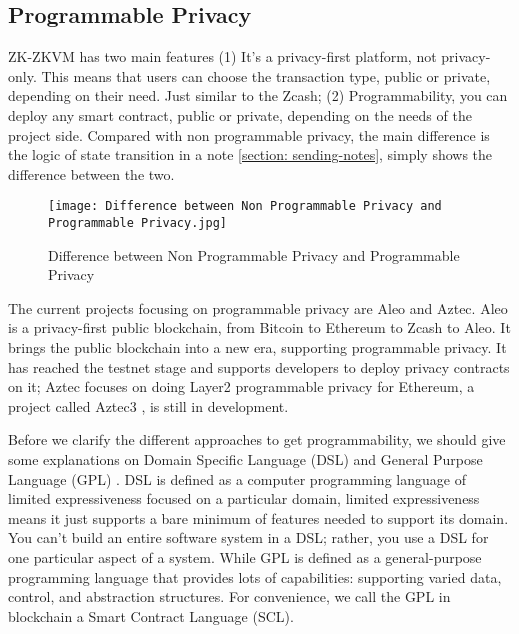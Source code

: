 \subsection{Programmable Privacy}

ZK-ZKVM has two main features (1) It's a privacy-first platform, not privacy-only. This means that users can choose the transaction type, public or private, depending on their need. Just similar to the Zcash;
(2) Programmability, you can deploy any smart contract, public or private, depending on the needs of the project side. Compared with non programmable privacy, the main difference is the logic of state transition in a note \ref{section: sending-notes},  simply shows the difference 
between the two.
\begin{figure}[!ht]
    \centering
    \texttt{[image: Difference between Non Programmable Privacy and Programmable Privacy.jpg]}
    \caption{Difference between Non Programmable Privacy and Programmable Privacy}
    \label{fig:Difference between Non Programmable Privacy and Programmable Privacy}
\end{figure}

The current projects focusing on programmable privacy are Aleo \cite{website:Aleo} and Aztec. Aleo is a 
privacy-first public blockchain, from Bitcoin \cite{website:BTC} to Ethereum to Zcash \cite{website:Zcash} to Aleo. It brings the public blockchain into a new era,
supporting programmable privacy. 
It has reached the testnet stage and supports developers to deploy privacy contracts on it; 
Aztec focuses on doing Layer2 programmable privacy for Ethereum, a project 
called Aztec3 \cite{website:Aztec3}, is still in development.

Before we clarify the different approaches to get programmability, we should give some explanations on Domain Specific Language (DSL) and General Purpose Language (GPL) \cite{website:DSL}.
DSL is defined as a computer programming language of limited expressiveness focused on a particular domain, limited expressiveness means it just supports a bare minimum of features 
needed to support its domain. You can't build an entire software system in a DSL; rather, you use a DSL for one particular aspect of a system. While GPL is defined as a general-purpose programming language
that provides lots of capabilities: supporting varied data, control, and abstraction structures. For convenience, we call the GPL in blockchain a Smart Contract Language (SCL).

